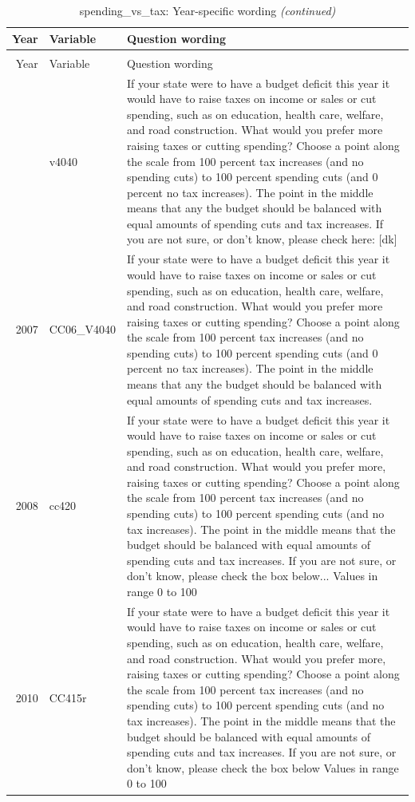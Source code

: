 \documentclass[12pt]{article}
\begin{document}
\begin{longtable}[t]{rl>{\raggedright\arraybackslash}p{10cm}}
\caption{\label{tab:unnamed-chunk-4}spending\_vs\_tax: Year-specific wording}\\
\toprule
Year & Variable & Question wording\\
\midrule
\endfirsthead
\caption[]{spending\_vs\_tax: Year-specific wording \textit{(continued)}}\\
\toprule
Year & Variable & Question wording\\
\midrule
\endhead
\
\endfoot
\bottomrule
\endlastfoot
2006 & v4040 & If your state were to have a budget deficit this year it would have to raise taxes on income or sales or cut spending, such as on education, health care, welfare, and road construction. What would you prefer more raising taxes or cutting spending? Choose a point along the scale from 100 percent tax increases (and no spending cuts) to 100 percent spending cuts (and 0 percent no tax increases). The point in the middle means that any the budget should be balanced with equal amounts of spending cuts and tax increases.  If you are not sure, or don't know, please check here: [dk]\\
2007 & CC06\_V4040 & If your state were to have a budget deficit this year it would have to raise taxes on income or sales or cut spending, such as on education, health care, welfare, and road construction. What would you prefer more raising taxes or cutting spending? Choose a point along the scale from 100 percent tax increases (and no spending cuts) to 100 percent spending cuts (and 0 percent no tax increases). The point in the middle means that any the budget should be balanced with equal amounts of spending cuts and tax increases.\\
2008 & cc420 & If your state were to have a budget deficit this year it would have to raise taxes on income or sales or cut spending, such as on education, health care, welfare, and road construction. What would you prefer more, raising taxes or cutting spending? Choose a point along the scale from 100 percent tax increases (and no spending cuts) to 100 percent spending cuts (and no tax increases). The point in the middle means that the budget should be balanced with equal amounts of spending cuts and tax increases.  If you are not sure, or don't know, please check the box below... Values in range 0 to 100\\
2010 & CC415r & If your state were to have a budget deficit this year it would have to raise taxes on income or sales or cut spending, such as on education, health care, welfare, and road construction. What would you prefer more, raising taxes or cutting spending? Choose a point along the scale from 100 percent tax increases (and no spending cuts) to 100 percent spending cuts (and no tax increases). The point in the middle means that the budget should be balanced with equal amounts of spending cuts and tax increases. If you are not sure, or don't know, please check the box below Values in range 0 to 100\\

\end{longtable}
\end{document}
